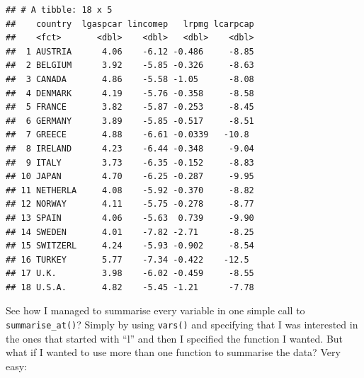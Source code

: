 \documentclass[]{gitbook}
\newenvironment{Shaded}{\begin{snugshade}}{\end{snugshade}}
\newcommand{\KeywordTok}[1]{\textcolor[rgb]{0.13,0.29,0.53}{\textbf{#1}}}
\newcommand{\NormalTok}[1]{#1}
\newcommand{\OperatorTok}[1]{\textcolor[rgb]{0.81,0.36,0.00}{\textbf{#1}}}
\newcommand{\StringTok}[1]{\textcolor[rgb]{0.31,0.60,0.02}{#1}}
\theoremstyle{definition}
\theoremstyle{definition}
\theoremstyle{definition}
\theoremstyle{remark}
\begin{document}
\begin{verbatim}
## # A tibble: 18 x 5
##    country  lgaspcar lincomep   lrpmg lcarpcap
##    <fct>       <dbl>    <dbl>   <dbl>    <dbl>
##  1 AUSTRIA      4.06    -6.12 -0.486     -8.85
##  2 BELGIUM      3.92    -5.85 -0.326     -8.63
##  3 CANADA       4.86    -5.58 -1.05      -8.08
##  4 DENMARK      4.19    -5.76 -0.358     -8.58
##  5 FRANCE       3.82    -5.87 -0.253     -8.45
##  6 GERMANY      3.89    -5.85 -0.517     -8.51
##  7 GREECE       4.88    -6.61 -0.0339   -10.8 
##  8 IRELAND      4.23    -6.44 -0.348     -9.04
##  9 ITALY        3.73    -6.35 -0.152     -8.83
## 10 JAPAN        4.70    -6.25 -0.287     -9.95
## 11 NETHERLA     4.08    -5.92 -0.370     -8.82
## 12 NORWAY       4.11    -5.75 -0.278     -8.77
## 13 SPAIN        4.06    -5.63  0.739     -9.90
## 14 SWEDEN       4.01    -7.82 -2.71      -8.25
## 15 SWITZERL     4.24    -5.93 -0.902     -8.54
## 16 TURKEY       5.77    -7.34 -0.422    -12.5 
## 17 U.K.         3.98    -6.02 -0.459     -8.55
## 18 U.S.A.       4.82    -5.45 -1.21      -7.78
\end{verbatim}

See how I managed to summarise every variable in one simple call to
\texttt{summarise\_at()}? Simply by using \texttt{vars()} and specifying
that I was interested in the ones that started with ``l'' and then I
specified the function I wanted. But what if I wanted to use more than
one function to summarise the data? Very easy:

\begin{Shaded}
\end{Shaded}
\end{document}
